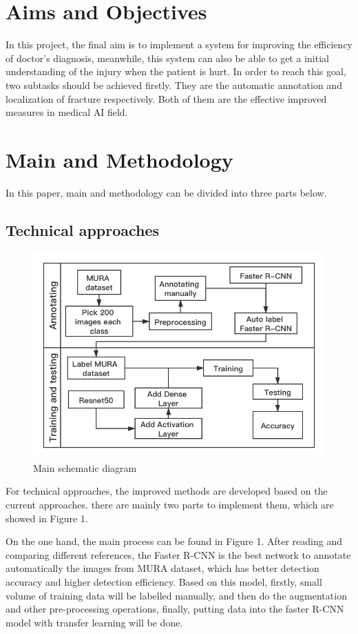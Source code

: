 \documentclass[12pt,oneside,a4paper]{article}
\begin{document}
\section{Aims and Objectives}
In this project, the final aim is to implement a system for improving the efficiency of doctor’s diagnosis, meanwhile, this system can also be able to get a initial understanding of the injury when the patient is hurt. In order to reach this goal, two subtasks should be achieved firstly. They are the automatic annotation and localization of fracture respectively. Both of them are the effective improved measures in medical AI field.
\section{Main and Methodology}
In this paper, main and methodology can be divided into three parts below.
\subsection{Technical approaches}
\begin{figure}
\begin{center}
\includegraphics[width=1\columnwidth]{images/architecture.png}
\caption{Main schematic diagram}
\end{center}
\end{figure}

For technical approaches, the improved methods are developed based on the current approaches. there are mainly two parts to implement them, which are showed in Figure 1.

On the one hand, the main process can be found in Figure 1. After reading and comparing different references, the Faster R-CNN is the best network to annotate automatically the images from MURA dataset, which has better detection accuracy and higher detection efficiency. Based on this model, firstly, small volume of training data will be labelled manually, and then do the augmentation and other pre-processing operations, finally, putting data into the faster R-CNN model with transfer learning will be done.
\end{document}

